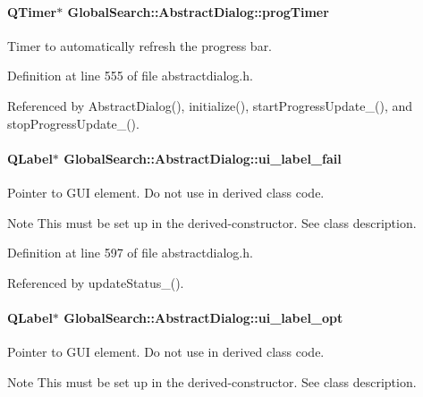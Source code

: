 \paragraph[{prog\+Timer}]{\setlength{\rightskip}{0pt plus 5cm}Q\+Timer$\ast$ Global\+Search\+::\+Abstract\+Dialog\+::prog\+Timer\hspace{0.3cm}{\ttfamily [protected]}}\label{classGlobalSearch_1_1AbstractDialog_a1cf317e8206fd80628a9fe6d2ec711fc}
Timer to automatically refresh the progress bar. 

Definition at line 555 of file abstractdialog.\+h.



Referenced by Abstract\+Dialog(), initialize(), start\+Progress\+Update\+\_\+(), and stop\+Progress\+Update\+\_\+().

\hypertarget{classGlobalSearch_1_1AbstractDialog_a28b127a410ed219e13a0e85c889934e7}{}
\paragraph[{ui\+\_\+label\+\_\+fail}]{\setlength{\rightskip}{0pt plus 5cm}Q\+Label$\ast$ Global\+Search\+::\+Abstract\+Dialog\+::ui\+\_\+label\+\_\+fail\hspace{0.3cm}{\ttfamily [protected]}}\label{classGlobalSearch_1_1AbstractDialog_a28b127a410ed219e13a0e85c889934e7}
Pointer to G\+U\+I element. Do not use in derived class code. \begin{DoxyNote}{Note}
This must be set up in the derived-\/constructor. See class description. 
\end{DoxyNote}


Definition at line 597 of file abstractdialog.\+h.



Referenced by update\+Status\+\_\+().

\hypertarget{classGlobalSearch_1_1AbstractDialog_af30548b5ed4d5a22a7dc648afae4115b}{}
\paragraph[{ui\+\_\+label\+\_\+opt}]{\setlength{\rightskip}{0pt plus 5cm}Q\+Label$\ast$ Global\+Search\+::\+Abstract\+Dialog\+::ui\+\_\+label\+\_\+opt\hspace{0.3cm}{\ttfamily [protected]}}\label{classGlobalSearch_1_1AbstractDialog_af30548b5ed4d5a22a7dc648afae4115b}
Pointer to G\+U\+I element. Do not use in derived class code. \begin{DoxyNote}{Note}
This must be set up in the derived-\/constructor. See class description. 
\end{DoxyNote}


